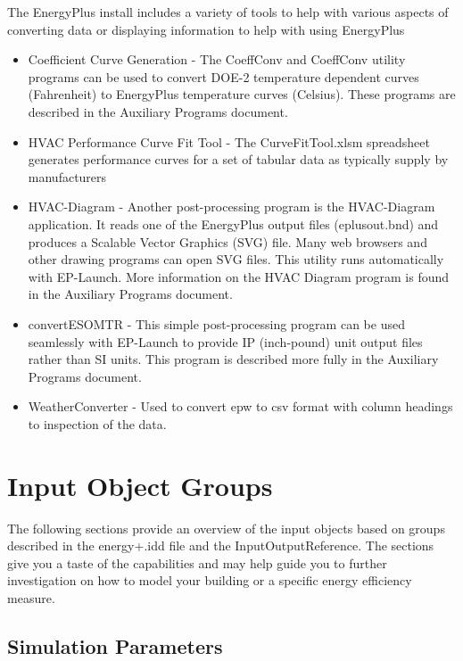 The EnergyPlus install includes a variety of tools to help with various
aspects of converting data or displaying information to help with
using EnergyPlus
\begin{itemize}
\item Coefficient Curve Generation - The CoeffConv and CoeffConv utility
programs can be used to convert DOE-2 temperature dependent curves
(Fahrenheit) to EnergyPlus temperature curves (Celsius). These programs
are described in the Auxiliary Programs document.
\item HVAC Performance Curve Fit Tool - The CurveFitTool.xlsm spreadsheet
generates performance curves for a set of tabular data as typically
supply by manufacturers
\item HVAC-Diagram - Another post-processing program is the HVAC-Diagram
application. It reads one of the EnergyPlus output files (eplusout.bnd)
and produces a Scalable Vector Graphics (SVG) file. Many web browsers
and other drawing programs can open SVG files. This utility runs automatically
with EP-Launch. More information on the HVAC Diagram program is found
in the Auxiliary Programs document.
\item convertESOMTR - This simple post-processing program can be used seamlessly
with EP-Launch to provide IP (inch-pound) unit output files rather
than SI units. This program is described more fully in the Auxiliary
Programs document.
\item WeatherConverter - Used to convert epw to csv format with column headings
to inspection of the data.
\end{itemize}

\chapter{Input Object Groups}

The following sections provide an overview of the input objects based
on groups described in the energy+.idd file and the InputOutputReference.
The sections give you a taste of the capabilities and may help guide
you to further investigation on how to model your building or a specific
energy efficiency measure.

\section{Simulation Parameters}

